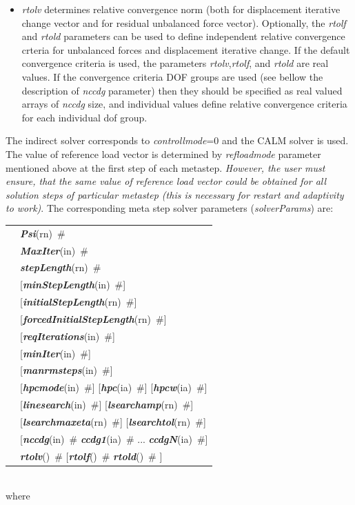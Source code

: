 \documentclass[a4paper]{article}
\makeatletter
\newcommand{\param}[1]{{\em #1}}
\newcommand{\keywordnotype}[1]{\mbox{{\it{\bf{#1}}}}}
\newcommand{\keyword}[2]{\mbox{{\keywordnotype{#1}\tiny (#2)}}}
\newcommand{\field}[2]{\mbox{\keyword{#1}{#2}~\#}}
\newcommand{\optField}[2]{\mbox{[\field{#1}{#2}]}}
\newenvironment{record}[1][]{\begin{tabular}{|ll}}{\end{tabular}\\}
\newcommand{\recentry}[2]{{#1}&{#2}\\}
\newcounter{rcc}
\newenvironment{record}[1][\textwidth]{\setcounter{rcc}{0}\begin{tabular*}{#1}{|ll@{\extracolsep{\fill}}r}}{\end{tabular*}\\}
\newcommand{\recentry}[2]{\ifthenelse{\value{rcc}>0}{&$\backslash$ \\}{\setcounter{rcc}{1}}{#1}&{#2}}
\makeatother
\begin{document}
\begin{itemize}
\item \param{rtolv} determines relative convergence norm (both for displacement
iterative change vector and for residual unbalanced force vector). Optionally, the \param{rtolf} and \param{rtold} parameters can be used to define
independent relative convergence crteria for unbalanced forces and displacement
iterative change. If the default convergence criteria is used,
the parameters \param{rtolv},\param{rtolf}, and \param{rtold} are real values. If the convergence criteria DOF groups are used (see bellow the description of \param{nccdg} parameter) then they should be specified as real valued arrays of \param{nccdg} size, and individual values define relative convergence criteria for each individual dof group.
\end{itemize}

The indirect solver corresponds to \param{controllmode}=0 and the CALM
solver is used. The value of reference load vector is determined by
\param{refloadmode} parameter mentioned above at the first step of
each metastep. {\em However, the user must ensure, that the same value of
reference load vector could be obtained for all solution steps of
particular metastep (this is necessary for restart and adaptivity to work)}.
The corresponding meta step solver parameters (\param{solverParams}) are:\\
\begin{record}
\recentry{\hspace{10mm}}{\field{Psi}{rn}}
\recentry{}{\field{MaxIter}{in}}
\recentry{}{\field{stepLength}{rn}}
\recentry{}{\optField{min\-Step\-Le\-ngth}{in}}
\recentry{}{\optField{initialStepLength}{rn}}
\recentry{}{\optField{forcedInitialStepLength}{rn}}
\recentry{}{\optField{reqIterations}{in}}
\recentry{}{\optField{minIter}{in}}
\recentry{}{\optField{manrmsteps}{in}}
\recentry{}{\optField{hpcmode}{in} \optField{hpc}{ia} \optField{hpcw}{ia}}
\recentry{}{\optField{linesearch}{in} \optField{lsearchamp}{rn}}
\recentry{}{\optField{lsearchmaxeta}{rn} \optField{lsearchtol}{rn}}
\recentry{}{[\field{nccdg}{in} \field{ccdg1}{ia} ... \field{ccdgN}{ia}]}
\recentry{}{\field{rtolv}{} [\field{rtolf}{} \field{rtold}{} ]}
\end{record}
where
\end{document}
